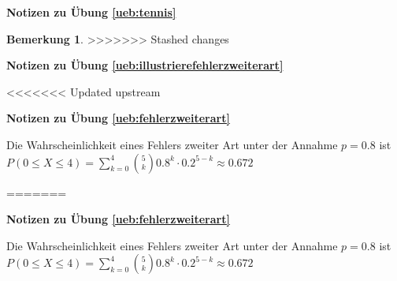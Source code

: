 \documentclass[%
<<<<<<< Updated upstream
<<<<<<< Updated upstream
11pt,%
twoside,%
titlepage,%
german,%
=======
=======
>>>>>>> Stashed changes
11pt,%
twoside,%
titlepage,%
swissgerman,%
<<<<<<< Updated upstream
>>>>>>> Stashed changes
=======
>>>>>>> Stashed changes
headsepline%
]{scrartcl}
\newcommand{\faReturnGray}{\textcolor{gray}{\faMailReply}} %
\theoremstyle{definition}
\newtheorem{bem}{Bemerkung}[subsection] %
\theoremstyle{plain}
\newcommand{\concatueb}[1]{ueb:#1}%
\newcommand{\concatlsg}[1]{lsg:#1}%
\newenvironment{lsg}[1]{%
    \par\noindent\textbf{Notizen zu Übung \ref{\concatueb{#1}}}\label{\concatlsg{#1}}
    \hfill\hyperref[\concatueb{#1}]{\faReturnGray}\par %
}{%
    \par%
}
\newcounter{theo}[section]\setcounter{theo}{0}
\newcommand{\concatueb}[1]{ueb:#1}%
\newcommand{\concatlsg}[1]{lsg:#1}%
\newenvironment{lsg}[1]{%
    \par\noindent\textbf{Notizen zu Übung \ref{\concatueb{#1}}.}%
    \label{\concatlsg{#1}}
}{%
    \par%
}
\begin{document}
\begin{lsg}{tennis}
\begin{bem}
>>>>>>> Stashed changes
\begin{lsg}{illustrierefehlerzweiterart}
    \begin{center}
\end{center}
\end{lsg}
<<<<<<< Updated upstream
\begin{lsg}{fehlerzweiterart}
    Die Wahrscheinlichkeit eines Fehlers zweiter Art unter der Annahme $p=0.8$ ist $P(0\leq X\leq4)=\sum_{k=0}^4\binom{5}{k}0.8^k\cdot0.2^{5-k}\approx0.672$
\end{lsg}
=======

\begin{lsg}{fehlerzweiterart}
    Die Wahrscheinlichkeit eines Fehlers zweiter Art unter der Annahme $p=0.8$ ist $P(0\leq X\leq4)=\sum_{k=0}^4\binom{5}{k}0.8^k\cdot0.2^{5-k}\approx0.672$
\end{lsg}


\end{bem}
\end{lsg}
\end{document}
